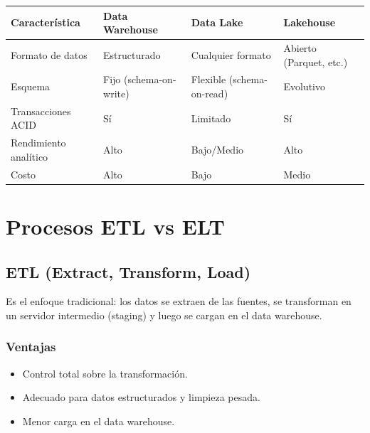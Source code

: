 \documentclass[12pt,a4paper,openany,oneside]{book}
\begin{document}
\begin{center}
\begin{tabular}{|l|l|l|l|}
\hline
\textbf{Característica} & \textbf{Data Warehouse} & \textbf{Data Lake} & \textbf{Lakehouse} \\ \hline
Formato de datos & Estructurado & Cualquier formato & Abierto (Parquet, etc.) \\
Esquema & Fijo (schema-on-write) & Flexible (schema-on-read) & Evolutivo \\
Transacciones ACID & Sí & Limitado & Sí \\
Rendimiento analítico & Alto & Bajo/Medio & Alto \\
Costo & Alto & Bajo & Medio \\ \hline
\end{tabular}
\end{center}

\chapter{Procesos ETL vs ELT}
\section{ETL (Extract, Transform, Load)}
Es el enfoque tradicional: los datos se extraen de las fuentes, se transforman en un servidor intermedio (staging) y luego se cargan en el data warehouse.

\begin{center}
\end{center}

\subsection{Ventajas}
\begin{itemize}
    \item Control total sobre la transformación.
    \item Adecuado para datos estructurados y limpieza pesada.
    \item Menor carga en el data warehouse.
\end{itemize}
\end{document}
